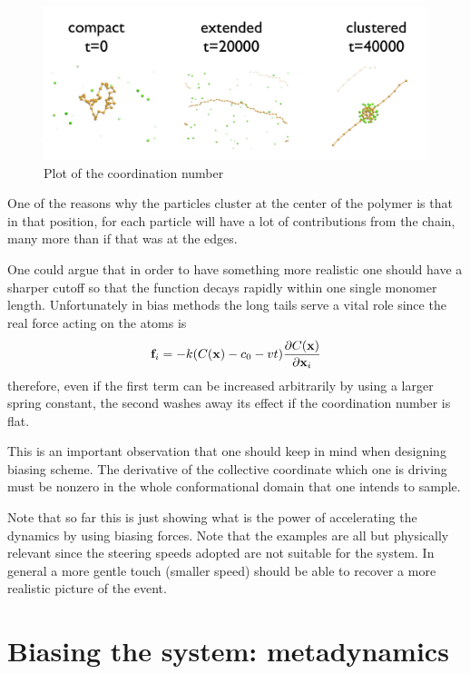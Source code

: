 \documentclass[10pt,fleqn,a4paper]{report}
\begin{document}
\begin{figure}[h!]
\begin{center}
\includegraphics[width=15cm,angle=0]{./figures/coord_traj}
\caption{Plot of the coordination number}
\label{coord_traj}
\end{center}
\end{figure} 


One of the reasons why the particles cluster at the center of the polymer is that in that position, for each particle will have a lot of contributions from the chain, many more than if that was at the edges.

One could argue that in order to have something more realistic one should have a sharper cutoff so that the function decays rapidly within one single monomer length. Unfortunately in bias methods the long tails serve a vital role since the real force acting on the atoms is 
\begin{equation}
{\bf f}_i=-k(C({\bf x}) -c_0-vt)\frac{\partial C({\bf x}) }{\partial {\bf x}_i}
\end{equation}
therefore, even if the first term can be increased arbitrarily by using a larger
spring constant, the second washes away its effect if the coordination number is flat. 

This is an important observation that one should keep in mind when designing  biasing scheme.
The derivative of the collective coordinate which one is driving must be nonzero in the whole conformational domain that one intends to sample.

Note that so far this is just showing what is the power of accelerating the dynamics by using biasing forces. Note that the examples are all but physically relevant since the steering speeds adopted are not suitable for the system. In general a more gentle touch (smaller speed) should be able to recover a more realistic picture of the event.



\chapter{Biasing the system: metadynamics}
\end{document}

